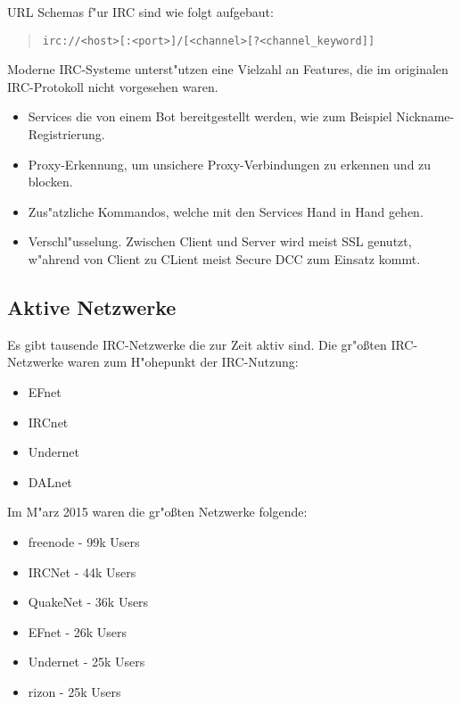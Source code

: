 URL Schemas f"ur IRC sind wie folgt aufgebaut:
\begin{quote}
\verb|irc://<host>[:<port>]/[<channel>[?<channel_keyword]]|
\end{quote}
Moderne IRC-Systeme unterst"utzen eine Vielzahl an Features, die im originalen IRC-Protokoll nicht vorgesehen waren.
\begin{itemize}
\item Services die von einem Bot bereitgestellt werden, wie zum Beispiel Nickname-Registrierung.
\item Proxy-Erkennung, um unsichere Proxy-Verbindungen zu erkennen und zu blocken.
\item Zus"atzliche Kommandos, welche mit den Services Hand in Hand gehen.
\item Verschl"usselung. Zwischen Client und Server wird meist SSL genutzt, w"ahrend von Client zu CLient meist Secure DCC zum Einsatz kommt.
\end{itemize}
\subsection{Aktive Netzwerke}
Es gibt tausende IRC-Netzwerke die zur Zeit aktiv sind. Die gr"oßten IRC-Netzwerke waren zum H"ohepunkt der IRC-Nutzung:
\begin{itemize}
\item EFnet
\item IRCnet
\item Undernet
\item DALnet
\end{itemize}
Im M"arz 2015 waren die gr"oßten Netzwerke folgende:
\begin{itemize}
\item freenode - 99k Users
\item IRCNet - 44k Users
\item QuakeNet - 36k Users
\item EFnet - 26k Users
\item Undernet - 25k Users
\item rizon - 25k Users
\end{itemize}

